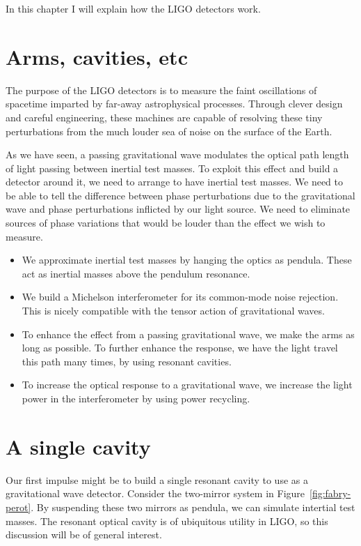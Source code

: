 \label{chapter2}

In this chapter I will explain how the LIGO detectors work.

\section{Arms, cavities, etc}

The purpose of the LIGO detectors is to measure the faint
oscillations of spacetime imparted by far-away astrophysical
processes.  Through clever design and careful engineering, these
machines are capable of resolving these tiny perturbations from the
much louder sea of noise on the surface of the Earth.

As we have seen, a passing gravitational wave modulates the optical
path length of light passing between inertial test
masses.  To exploit this effect and build a detector around it, we
need to arrange to have inertial test masses.  We need to be able to
tell the difference between phase perturbations due to the
gravitational wave and phase perturbations inflicted by our light
source.  We need to eliminate sources of phase variations that would
be louder than the effect we wish to measure.  

\begin{itemize}
\item We approximate inertial test masses by hanging the optics as
  pendula.  These act as inertial masses above the pendulum resonance.
\item We build a Michelson interferometer for its common-mode noise
  rejection.  This is nicely compatible with the tensor action of
  gravitational waves.
\item To enhance the effect from a passing gravitational wave, we make
  the arms as long as possible.  To further enhance the response, we
  have the light travel this path many times, by using resonant cavities.
\item To increase the optical response to a gravitational wave, we
  increase the light power in the interferometer by using power
  recycling.
\end{itemize}

\section{A single cavity}

Our first impulse might be to build a single resonant cavity to use as
a gravitational wave detector.  Consider the two-mirror system in
Figure~\ref{fig:fabry-perot}.  By suspending these two mirrors as
pendula, we can simulate intertial test masses.  The resonant optical
cavity is of ubiquitous utility in LIGO, so this discussion will be of
general interest.

